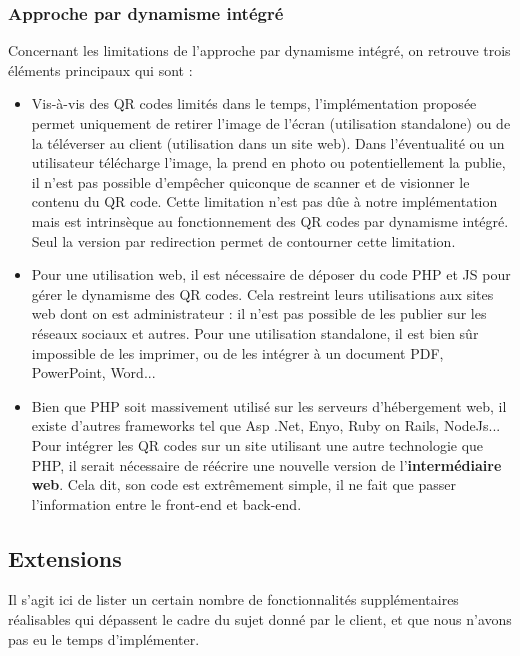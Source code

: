 \documentclass[a4paper,12pt]{article}
\begin{document}
\subsubsection{Approche par dynamisme intégré}
\noindent Concernant les limitations de l'approche par dynamisme intégré, on retrouve trois éléments principaux qui sont :\\
\begin{itemize}

  \item Vis-à-vis des QR codes limités dans le temps, l'implémentation proposée permet uniquement de retirer l'image de l'écran (utilisation standalone) ou de la téléverser au client (utilisation dans un site web). Dans l'éventualité ou un utilisateur télécharge l'image, la prend en photo ou potentiellement la publie, il n'est pas possible d'empêcher quiconque de scanner et de visionner le contenu du QR code. Cette limitation n'est pas dûe à notre implémentation mais est intrinsèque au fonctionnement des QR codes par dynamisme intégré. Seul la version par redirection permet de contourner cette limitation.\\
  
  \item Pour une utilisation web, il est nécessaire de déposer du code PHP et JS pour gérer le dynamisme des QR codes. Cela restreint leurs utilisations aux sites web dont on est administrateur : il n'est pas possible de les publier sur les réseaux sociaux et autres. Pour une utilisation standalone, il est bien sûr impossible de les imprimer, ou de les intégrer à un document PDF, PowerPoint, Word...\\

  \item Bien que PHP soit massivement utilisé sur les serveurs d'hébergement web, il existe d'autres frameworks tel que Asp .Net, Enyo, Ruby on Rails, NodeJs... Pour intégrer les QR codes sur un site utilisant une autre technologie que PHP, il serait nécessaire de réécrire une nouvelle version de l'\textbf{intermédiaire web}. Cela dit, son code est extrêmement simple, il ne fait que passer l'information entre le front-end et back-end.\\
  
\end{itemize}

\subsection{Extensions}
\label{ExtensionsProposées}
\noindent Il s'agit ici de lister un certain nombre de fonctionnalités supplémentaires réalisables qui dépassent le cadre du sujet donné par le client, et que nous n'avons pas eu le temps d'implémenter.\\
\end{document}
